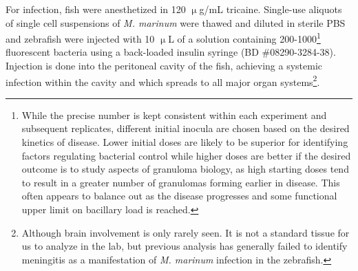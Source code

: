 For infection, fish were anesthetized in 120 $\upmu$g/mL tricaine. Single-use aliquots of single cell suspensions of \textit{M. marinum} were thawed and diluted in sterile PBS and zebrafish were injected with 10 $\upmu$L of a solution containing 200-1000\footnote{While the precise number is kept consistent within each experiment and subsequent replicates, different initial inocula are chosen based on the desired kinetics of disease. Lower initial doses are likely to be superior for identifying factors regulating bacterial control while higher doses are better if the desired outcome is to study aspects of granuloma biology, as high starting doses tend to result in a greater number of granulomas forming earlier in disease. This often appears to balance out as the disease progresses and some functional upper limit on bacillary load is reached.} fluorescent bacteria using a back-loaded insulin syringe (BD \#08290-3284-38). Injection is done into the peritoneal cavity of the fish, achieving a systemic infection within the cavity and which spreads to all major organ systems\footnote{Although brain involvement is only rarely seen. It is not a standard tissue for us to analyze in the lab, but previous analysis has generally failed to identify meningitis as a manifestation of \textit{M. marinum} infection in the zebrafish.}. 

